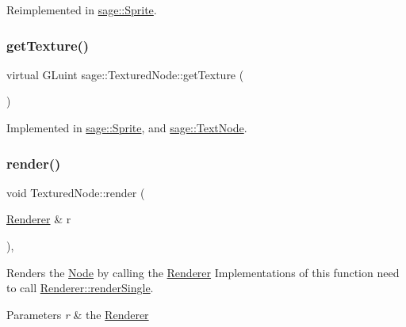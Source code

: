 Reimplemented in \mbox{\hyperlink{classsage_1_1Sprite_a3e5acc98484d2f326fdd1ff622cfd2ff}{sage\+::\+Sprite}}.

\mbox{\label{classsage_1_1TexturedNode_a079cea0b12a1d0e3ea69459546736c0f}} 
\subsubsection{\texorpdfstring{getTexture()}{getTexture()}}
{\footnotesize\ttfamily virtual G\+Luint sage\+::\+Textured\+Node\+::get\+Texture (\begin{DoxyParamCaption}{ }\end{DoxyParamCaption})\hspace{0.3cm}{\ttfamily [pure virtual]}}



Implemented in \mbox{\hyperlink{classsage_1_1Sprite_aa75f3595b809f99847a9642ce2bf319a}{sage\+::\+Sprite}}, and \mbox{\hyperlink{classsage_1_1TextNode_ae21f17c6cb993692d8da89424b2581d7}{sage\+::\+Text\+Node}}.

\mbox{\label{classsage_1_1TexturedNode_a3ced7cf384aac86fb84face2dc62e395}} 
\subsubsection{\texorpdfstring{render()}{render()}}
{\footnotesize\ttfamily void Textured\+Node\+::render (\begin{DoxyParamCaption}\item[{\mbox{\hyperlink{classsage_1_1Renderer}{Renderer}} \&}]{r }\end{DoxyParamCaption})\hspace{0.3cm}{\ttfamily [override]}, {\ttfamily [virtual]}}



Renders the \mbox{\hyperlink{classsage_1_1Node}{Node}} by calling the \mbox{\hyperlink{classsage_1_1Renderer}{Renderer}} Implementations of this function need to call \mbox{\hyperlink{classsage_1_1Renderer_aa79cfd587fa85ae8ea7ccf465825d212}{Renderer\+::render\+Single}}. 


\begin{DoxyParams}{Parameters}
{\em r} & the \mbox{\hyperlink{classsage_1_1Renderer}{Renderer}} \\
\hline
\end{DoxyParams}


